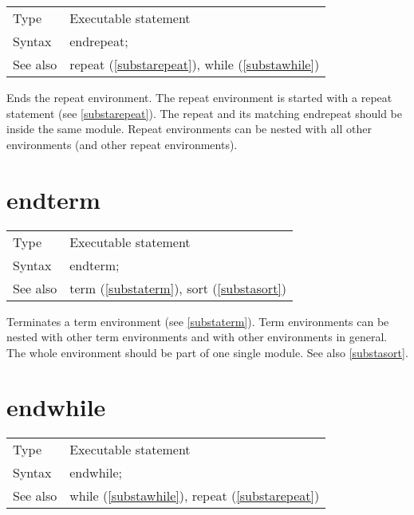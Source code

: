\noindent \begin{tabular}{ll}
Type & Executable statement\\
Syntax & endrepeat;
\\ See also & repeat (\ref{substarepeat}), while (\ref{substawhile})
\end{tabular} \vspace{4mm}

\noindent Ends the repeat 
environment. The repeat environment is started 
with a repeat statement (see \ref{substarepeat}). The repeat and its 
matching endrepeat should be inside the same module. 
Repeat environments can be nested with all other environments (and other 
repeat environments). \vspace{10mm}


\section{endterm}
\label{substaendterm}

\noindent \begin{tabular}{ll}
Type & Executable statement\\
Syntax & endterm;
\\ See also & term (\ref{substaterm}), sort (\ref{substasort})
\end{tabular} \vspace{4mm}

\noindent Terminates a term environment 
(see \ref{substaterm}). Term environments can be nested with 
other term environments and with other environments in general. The whole 
environment should be part of one single module. See also \ref{substasort}. 
\vspace{10mm}


\section{endwhile}
\label{substaendwhile}

\noindent \begin{tabular}{ll}
Type & Executable statement\\
Syntax & endwhile;
\\ See also & while (\ref{substawhile}), repeat (\ref{substarepeat})
\end{tabular} \vspace{4mm}

